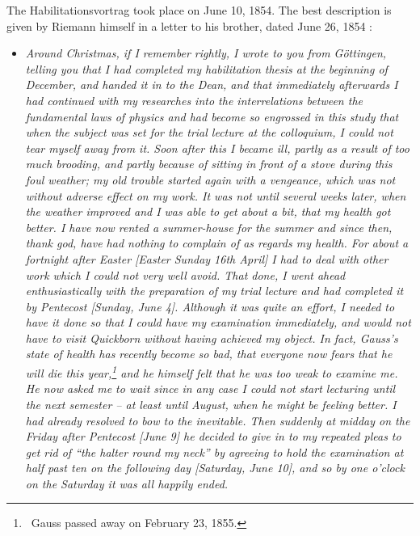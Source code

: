 \documentclass[12pt]{article}
\begin{document}
The Habilitationsvortrag took place on June 10, 1854. The best description is given by Riemann himself in a letter to his brother, dated June 26, 1854 \cite{Dedekind1876b,Gallagher1981}:

\begin{itemize}

\item[]{\it Around Christmas, if I remember rightly, I wrote to you from G\"ottingen, telling you that I had completed my habilitation thesis at the beginning of December, and handed it in to the Dean, and that immediately afterwards I had continued with my researches into the interrelations between the fundamental laws of physics and had become so engrossed in this study that when the subject was set for the trial lecture at the colloquium, I could not tear myself away from it. Soon after this I became ill, partly as a result of too much brooding, and partly because of sitting in front of a stove during this foul weather; my old trouble started again with a vengeance, which was not without adverse effect on my work. It was not until several weeks later, when the weather improved and I was able to get about a bit, that my health got better. I have now rented a summer-house for the summer and since then, thank god, have had nothing to complain of as regards my health. For about a fortnight after Easter [Easter Sunday 16th April] I had to deal with other work which I could not very well avoid. That done, I went ahead enthusiastically with the preparation of my trial lecture and had completed it by Pentecost [Sunday, June 4]. Although it was quite an effort, I needed to have it done so that I could have my examination immediately, and would not have to visit Quickborn without having achieved my object. In fact, Gauss's state of health has recently become so bad, that everyone now fears that he will die this year,\footnote{\ Gauss passed away on February 23, 1855.} and he himself felt that he was too weak to examine me. He now asked me to wait since in any case I could not start lecturing until the next semester -- at least until August, when he might be feeling better. I had already resolved to bow to the inevitable. Then suddenly at midday on the Friday after Pentecost [June 9] he decided to give in to my repeated pleas to get rid of ``the halter round my neck'' by agreeing to hold the examination at half past ten on the following day [Saturday, June 10], and so by one o'clock on the Saturday it was all happily ended.}

\end{itemize}
\end{document}
